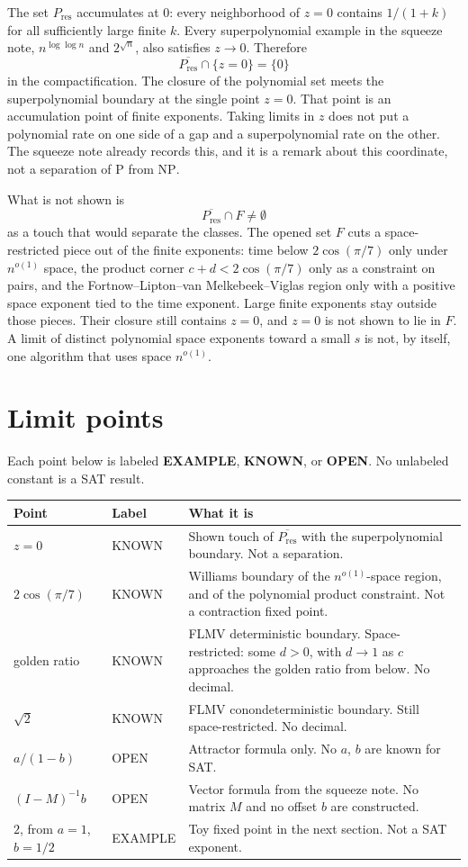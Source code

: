 \documentclass{article}
\begin{document}
The set \(P_{\mathrm{res}}\) accumulates at \(0\): every neighborhood of \(z=0\) contains \(1/(1+k)\) for all sufficiently large finite \(k\).
Every superpolynomial example in the squeeze note, \(n^{\log\log n}\) and \(2^{\sqrt{n}}\), also satisfies \(z\to 0\).
Therefore
\[
\overline{P_{\mathrm{res}}}\cap\{z=0\}=\{0\}
\]
in the compactification.
The closure of the polynomial set meets the superpolynomial boundary at the single point \(z=0\).
That point is an accumulation point of finite exponents.
Taking limits in \(z\) does not put a polynomial rate on one side of a gap and a superpolynomial rate on the other.
The squeeze note already records this, and it is a remark about this coordinate, not a separation of \(\mathrm{P}\) from \(\mathrm{NP}\).

What is not shown is
\[
\overline{P_{\mathrm{res}}}\cap F\neq\emptyset
\]
as a touch that would separate the classes.
The opened set \(F\) cuts a space-restricted piece out of the finite exponents: time below \(2\cos(\pi/7)\) only under \(n^{o(1)}\) space, the product corner \(c+d<2\cos(\pi/7)\) only as a constraint on pairs, and the Fortnow--Lipton--van Melkebeek--Viglas region only with a positive space exponent tied to the time exponent.
Large finite exponents stay outside those pieces.
Their closure still contains \(z=0\), and \(z=0\) is not shown to lie in \(F\).
A limit of distinct polynomial space exponents toward a small \(s\) is not, by itself, one algorithm that uses space \(n^{o(1)}\).

\section{Limit points}
Each point below is labeled \textbf{EXAMPLE}, \textbf{KNOWN}, or \textbf{OPEN}.
No unlabeled constant is a SAT result.

\begin{center}
\begin{tabular}{@{}llp{2.7in}@{}}
\hline
Point & Label & What it is \\
\hline
\(z=0\) & KNOWN &
Shown touch of \(\overline{P_{\mathrm{res}}}\) with the superpolynomial boundary.
Not a separation. \\
\(2\cos(\pi/7)\) & KNOWN &
Williams boundary of the \(n^{o(1)}\)-space region, and of the polynomial product constraint.
Not a contraction fixed point. \\
golden ratio & KNOWN &
FLMV deterministic boundary.
Space-restricted: some \(d>0\), with \(d\to 1\) as \(c\) approaches the golden ratio from below.
No decimal. \\
\(\sqrt{2}\) & KNOWN &
FLMV conondeterministic boundary.
Still space-restricted.
No decimal. \\
\(a/(1-b)\) & OPEN &
Attractor formula only.
No \(a\), \(b\) are known for SAT. \\
\((I-M)^{-1}b\) & OPEN &
Vector formula from the squeeze note.
No matrix \(M\) and no offset \(b\) are constructed. \\
\(2\), from \(a=1\), \(b=1/2\) & EXAMPLE &
Toy fixed point in the next section.
Not a SAT exponent. \\
\hline
\end{tabular}
\end{center}
\end{document}
